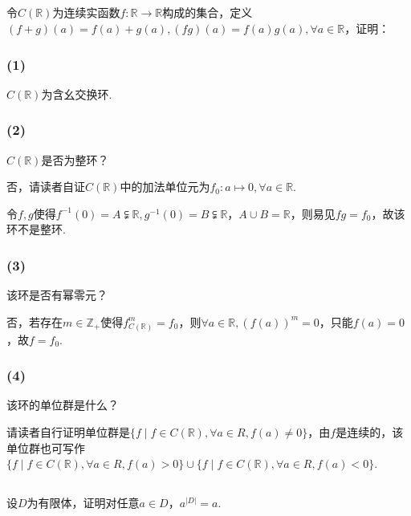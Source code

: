 
\subsection{}
令$C(\mathbb{R})$为连续实函数$f:\mathbb{R}\rightarrow \mathbb{R}$构成的集合，定义$(f+g)(a)=f(a)+g(a),(fg)(a)=f(a)g(a),\forall a\in\mathbb{R}$，证明：
\subsubsection{(1)}
$C(\mathbb{R})$为含幺交换环.

\Proofbyintimidation

\subsubsection{(2)}
$C(\mathbb{R})$是否为整环？

\jie 否，请读者自证$C(\mathbb{R})$中的加法单位元为$f_0: a\mapsto 0,\forall a\in \mathbb{R}$.

令$f,g$使得$f^{-1}(0)=A\subsetneqq\mathbb{R}, g^{-1}(0)=B\subsetneqq\mathbb{R}$，$A\cup B=\mathbb{R}$，则易见$fg=f_0$，故该环不是整环.

\subsubsection{(3)}
该环是否有幂零元？

\jie 否，若存在$m\in\mathbb{Z}_+$使得$f^m_{C(\mathbb{R})}=f_0$，则$\forall a\in\mathbb{R}, (f(a))^m=0$，只能$f(a)=0$，故$f=f_0$.

\subsubsection{(4)}
该环的单位群是什么？

\jie 请读者自行证明单位群是$\{f\mid f\in C(\mathbb{R}), \forall a\in R,f(a)\neq 0\}$，由$f$是连续的，该单位群也可写作$\{f\mid f\in C(\mathbb{R}), \forall a\in R,f(a)> 0\}\cup\{f\mid f\in C(\mathbb{R}), \forall a\in R,f(a)< 0\}$.

\subsection{}
设$D$为有限体，证明对任意$a\in D$，$a^{|D|}=a$.

